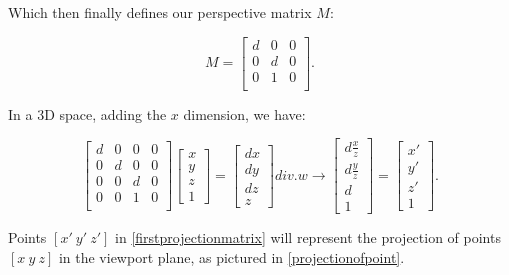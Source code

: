 \documentclass[cic,tc,english]{iiufrgs}
\begin{document}
Which then finally defines our perspective matrix $M$:

\begin{equation}
    M =
    \begin{bmatrix}
        d & 0 & 0 \\
        0 & d & 0 \\
        0 & 1 & 0 \\
    \end{bmatrix}
    .
\end{equation}

In a 3D space, adding the $x$ dimension, we have:


\begin{equation}
    \begin{bmatrix}
        d & 0 & 0 & 0 \\
        0 & d & 0 & 0 \\
        0 & 0 & d & 0 \\
        0 & 0 & 1 & 0 \\
    \end{bmatrix}
    \begin{bmatrix}
        x \\
        y \\
        z \\
        1
    \end{bmatrix}
    =
    \begin{bmatrix}
        d x \\
        d y \\
        d z \\
        z
    \end{bmatrix}
    div. w \rightarrow
    \begin{bmatrix}
        d \frac{x}{z} \\
        d \frac{y}{z} \\
        d             \\
        1
    \end{bmatrix}
    =
    \begin{bmatrix}
        x' \\
        y' \\
        z' \\
        1
    \end{bmatrix}
    \label{firstprojectionmatrix}
    .
\end{equation}

Points $[x'\ y'\ z']$ in \cref{firstprojectionmatrix} will represent the projection of points $[x\ y\ z]$ in the viewport plane, as pictured in \cref{projectionofpoint}.
\end{document}
